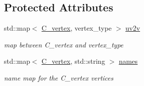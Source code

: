 \subsection*{Protected Attributes}
\begin{DoxyCompactItemize}
\item 
std\+::map$<$ \hyperlink{clique__covering__graph_8hpp_a9cb45047ea8c5ed95a8cfa90494345aa}{C\+\_\+vertex}, vertex\+\_\+type $>$ \hyperlink{classcoloring__based__clique__covering_a6a914b034e1c0c21e73709a0afd478ab}{uv2v}
\begin{DoxyCompactList}\small\item\em map between C\+\_\+vertex and vertex\+\_\+type \end{DoxyCompactList}\item 
std\+::map$<$ \hyperlink{clique__covering__graph_8hpp_a9cb45047ea8c5ed95a8cfa90494345aa}{C\+\_\+vertex}, std\+::string $>$ \hyperlink{classcoloring__based__clique__covering_a4b77fb0def42cc016b3f99f15259e8d4}{names}
\begin{DoxyCompactList}\small\item\em name map for the C\+\_\+vertex vertices \end{DoxyCompactList}\end{DoxyCompactItemize}
